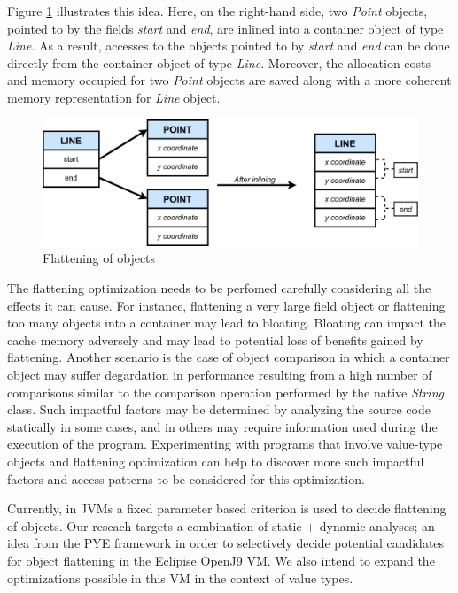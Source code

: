 \documentclass[12 pt, a4paper]{article}
\begin{document}
Figure \ref{fig:Figure 1} illustrates this idea. 
Here, on the right-hand side, two {\em Point} objects, pointed to by 
the fields {\em start} and {\em end}, are inlined into a container object 
of type \textit{Line}.
As a result, accesses to the objects pointed to by {\em start} and {\em end} 
can be done directly from the container object of type {\em Line}. Moreover, 
the allocation costs and memory occupied for two {\em Point} objects  are saved along
with a more coherent memory representation for {\em Line} object.

\begin{figure}[H]
	\vskip 0.2cm
	\centering
	\includegraphics[scale=0.2]{Images/Flattening_Line.jpg}
	\caption{Flattening of objects}
	\label{fig:Figure 1}
\end{figure}
The flattening optimization needs to be perfomed carefully considering all the effects it can cause. 
For instance, flattening a very large field object or flattening too many objects into a 
container may lead to bloating. Bloating can impact the cache memory adversely and may 
lead to potential loss of benefits gained by flattening. Another scenario is the case of object 
comparison in which a container object may suffer degardation in performance resulting 
from a high number of comparisons similar to the comparison operation performed by the native {\em String} class. 
Such impactful factors may be determined by analyzing the source code statically in some cases, and in others may require 
information used during the execution of the program. Experimenting with programs that involve 
value-type objects and flattening optimization 
can help to discover more such impactful factors and access patterns to be considered for this 
optimization. 

Currently, in JVMs a fixed parameter based criterion is used to decide flattening of objects.
Our reseach targets a combination of static + dynamic analyses; an idea from the PYE framework \citep{PYE2019} in 
order to selectively decide potential candidates for object flattening in the Eclipise OpenJ9 VM.
 We also intend to expand the optimizations 
possible in this VM in the context of value types. 
\end{document}
